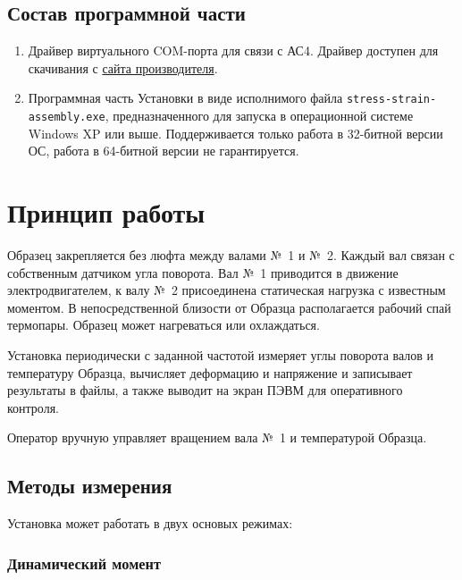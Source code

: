 \documentclass[12pt, a4paper, twocolumn]{report}
\begin{document}
\subsection{Состав программной части}
\label{sec_software}

\begin{enumerate}

\item Драйвер виртуального COM-порта для связи с АС4. Драйвер доступен для скачивания с \href{http://www.owen.ru/catalog/avtomaticheskij_preobrazovatel_interfejsov_usb_rs_485_owen_as4/opisanie}{сайта производителя}.

\item Программная часть Установки в виде исполнимого файла {\tt stress-strain-assembly.exe}, предназначенного для запуска в операционной системе Windows XP или выше. Поддерживается только работа в 32-битной версии ОС, работа в 64-битной версии не гарантируется.

\end{enumerate}

\section{Принцип работы}

Образец закрепляется без люфта между валами №~1 и №~2. Каждый вал связан с собственным датчиком угла поворота. Вал №~1 приводится в движение электродвигателем, к валу №~2 присоединена статическая нагрузка с известным моментом. В непосредственной близости от Образца располагается рабочий спай термопары. Образец может нагреваться или охлаждаться.

Установка периодически с заданной частотой измеряет углы поворота валов и температуру Образца, вычисляет деформацию и напряжение и записывает результаты в файлы, а также выводит на экран ПЭВМ для оперативного контроля.

Оператор вручную управляет вращением вала №~1 и температурой Образца.

\subsection{Методы измерения}
\label{sec_measurement_method}

Установка может работать в двух основых режимах:

\subsubsection{Динамический момент}
\end{document}
